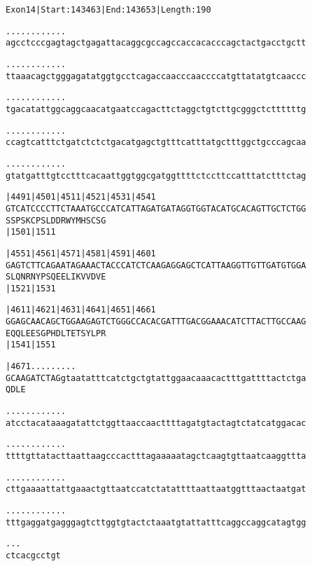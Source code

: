 \documentclass{article}
\begin{document}
\begin{alltt}
Exon 14 | Start: 143463 | End: 143653 | Length: 190

.    .    .    .    .    .    .    .    .    .    .    .    
agcctcccgagtagctgagattacaggcgccagccaccacacccagctactgacctgctt

.    .    .    .    .    .    .    .    .    .    .    .    
ttaaacagctgggagatatggtgcctcagaccaacccaaccccatgttatatgtcaaccc

.    .    .    .    .    .    .    .    .    .    .    .    
tgacatattggcaggcaacatgaatccagacttctaggctgtcttgcgggctcttttttg

.    .    .    .    .    .    .    .    .    .    .    .    
ccagtcatttctgatctctctgacatgagctgtttcatttatgctttggctgcccagcaa

.    .    .    .    .    .    .    .    .    .    .    .    
gtatgatttgtcctttcacaattggtggcgatggttttctccttccatttatctttctag

      |4491     |4501     |4511     |4521     |4531     |4541
GTCATCCCCTTCTAAATGCCCATCATTAGATGATAGGTGGTACATGCACAGTTGCTCTGG
 S  S  P  S  K  C  P  S  L  D  D  R  W  Y  M  H  S  C  S  G 
                |1501                         |1511         

      |4551     |4561     |4571     |4581     |4591     |4601
GAGTCTTCAGAATAGAAACTACCCATCTCAAGAGGAGCTCATTAAGGTTGTTGATGTGGA
 S  L  Q  N  R  N  Y  P  S  Q  E  E  L  I  K  V  V  D  V  E 
                |1521                         |1531         

      |4611     |4621     |4631     |4641     |4651     |4661
GGAGCAACAGCTGGAAGAGTCTGGGCCACACGATTTGACGGAAACATCTTACTTGCCAAG
 E  Q  Q  L  E  E  S  G  P  H  D  L  T  E  T  S  Y  L  P  R 
                |1541                         |1551         

      |4671    .    .    .    .    .    .    .    .    .    
GCAAGATCTAGgtaatatttcatctgctgtattggaacaaacactttgattttactctga
 Q  D  L  E                                                 

.    .    .    .    .    .    .    .    .    .    .    .    
atcctacataaagatattctggttaaccaacttttagatgtactagtctatcatggacac

.    .    .    .    .    .    .    .    .    .    .    .    
ttttgttatacttaattaagcccactttagaaaaatagctcaagtgttaatcaaggttta

.    .    .    .    .    .    .    .    .    .    .    .    
cttgaaaattattgaaactgttaatccatctatattttaattaatggtttaactaatgat

\end{alltt}
\newpage
\begin{alltt}
.    .    .    .    .    .    .    .    .    .    .    .    
tttgaggatgagggagtcttggtgtactctaaatgtattatttcaggccaggcatagtgg

.    .    .
ctcacgcctgt
\end{alltt}
\end{document}
